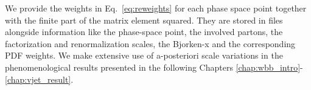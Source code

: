 We provide the weights in Eq.~\eqref{eq:reweights} for each
phase space point together with the finite part of the matrix element squared. They
are stored in \ntuple{} files alongside information like the phase-space
point, the involved partons, the factorization and renormalization
scales, the Bjorken-x and the corresponding PDF
weights. We make extensive use of a-posteriori scale variations in the phenomenological
results presented in the following Chapters \ref{chap:wbb_intro}-\ref{chap:vjet_result}.
